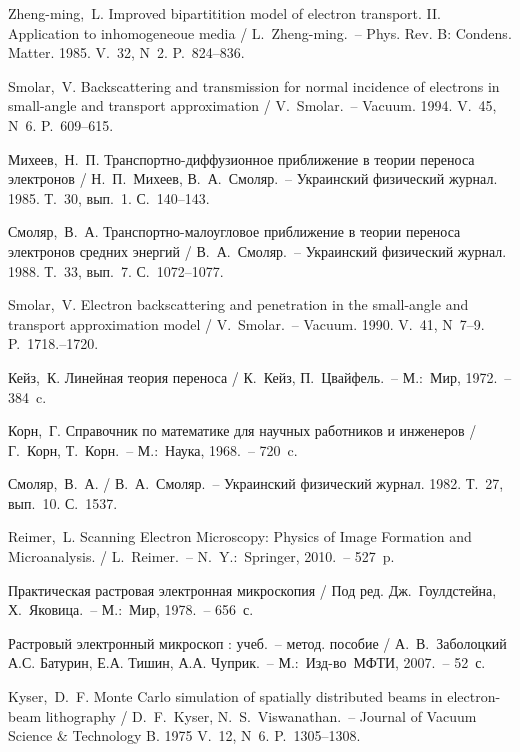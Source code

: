 \begin{thebibliography}{99}  

 Zheng-ming,~L. Improved bipartitition model of electron
transport. II. Application to inhomogeneoue media / L.~Zheng-ming.~-- Phys. Rev. B:
Condens. Matter. 1985. V.~32, N~2. P.~824--836.

 Smolar,~V. Backscattering and transmission for normal
incidence of electrons in small-angle and transport approximation /
V.~Smolar.~-- Vacuum. 1994. V.~45, N~6. P.~609--615.

 Михеев,~Н.~П. Транспортно-диффузионное приближение в теории
переноса электронов / Н.~П.~Михеев, В.~А.~Смоляр.~-- Украинский физический
журнал. 1985. Т.~30, вып.~1. С.~140--143.

 Смоляр,~В.~А. Транспортно-малоугловое приближение в теории
переноса электронов средних энергий / В.~А.~Смоляр.~-- Украинский физический
журнал. 1988. Т.~33, вып.~7. С.~1072--1077.

 Smolar,~V. Electron backscattering and penetration in the
small-angle and transport approximation model / V.~Smolar.~-- Vacuum. 1990.
V.~41, N~7--9. P.~1718.--1720.

 Кейз,~К. Линейная теория переноса / К.~Кейз, П.~Цвайфель.~--
М.:~Мир, 1972.~-- 384~c.

 Корн,~Г. Справочник по математике для научных работников и
инженеров /  Г.~Корн, Т.~Корн.~-- М.:~Наука, 1968.~-- 720~c.

 Смоляр,~В.~А. / В.~А.~Смоляр.~-- Украинский физический журнал.
1982. Т.~27, вып.~10. С.~1537. %


 Reimer,~L. Scanning Electron Microscopy: Physics of Image Formation
and Microanalysis. / L.~Reimer.~-- N.~Y.:~Springer, 2010.~-- 527~p.

 Практическая растровая электронная микроскопия / Под ред.
Дж.~Гоулдстейна, Х.~Яковица.~-- М.:~Мир, 1978.~-- 656~с.

 Растровый электронный микроскоп : учеб.~-- метод. пособие /
А.~В.~Заболоцкий А.С. Батурин, Е.А. Тишин, А.А. Чуприк.~-- М.:~Изд-во~МФТИ, 2007.~--
52~с.

 Kyser,~D.~F. Monte Carlo simulation of spatially
distributed beams in electron-beam lithography / D.~F.~Kyser,
N.~S.~Viswanathan.~-- Journal of Vacuum Science \& Technology B. 1975 V.~12,
N~6. P.~1305--1308.


\end{thebibliography}
